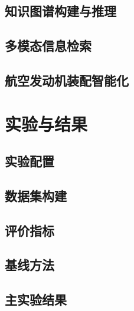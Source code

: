 \documentclass[12pt, a4paper]{article}
\begin{document}
\subsection{知识图谱构建与推理}

\subsection{多模态信息检索}

\subsection{航空发动机装配智能化}





\section{实验与结果}

\subsection{实验配置}

\subsection{数据集构建}

\subsection{评价指标}

\subsection{基线方法}

\subsection{主实验结果}
\end{document}

